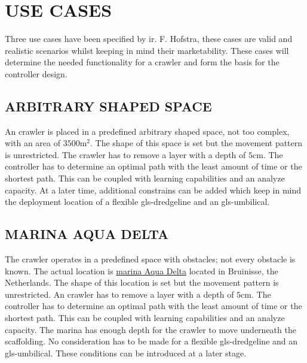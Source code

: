 \section{USE CASES}\label{sec:usecases}
Three use cases have been specified by ir. F. Hofstra, these cases are valid and realistic scenarios whilst keeping 
in mind their marketability. These cases will determine the needed functionality for a crawler and form the basis
for the controller design.

\subsection{ARBITRARY SHAPED SPACE}\label{sec:usecase1}
An crawler is placed in a predefined arbitrary shaped space, not too complex, with an area of \( 3500
\si{\square\metre} \). The shape of this space is set but the movement pattern is unrestricted. The crawler has to
remove a layer with a depth of \( 5 \si{\cm} \). The controller has to determine an optimal path with the least
amount of time or the shortest path. This can be coupled with learning capabilities and an analyze capacity. At a
later time, additional constrains can be added which keep in mind the deployment location of a flexible
\gls{gls-dredgeline} and an \gls{gls-umbilical}.

\subsection{MARINA AQUA DELTA}\label{sec:usecase2}
The crawler operates in a predefined space with obstacles; not every obstacle is known. The actual location is
\href{https://www.google.nl/maps/place/Jachthaven+Bruinisse/@51.6712838,4.0824101,
15z/data=!4m2!3m1!1s0x0:0x9c840ab80bde39c8}{marina Aqua Delta} located in Bruinisse, the Netherlands. The shape of
this location is set but the movement pattern is unrestricted. An crawler has to remove a layer with a depth of \( 5
\si{\cm} \). The controller has to determine an optimal path with the least amount of time or the shortest path. This
can be coupled with learning capabilities and an analyze capacity. The marina has enough depth for the crawler to
move underneath the scaffolding. No consideration has to be made for a flexible \gls{gls-dredgeline} and an 
\gls{gls-umbilical}. These conditions can be introduced at a later stage.

